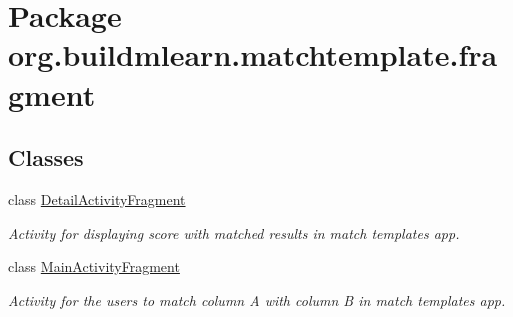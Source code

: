 \hypertarget{namespaceorg_1_1buildmlearn_1_1matchtemplate_1_1fragment}{}\section{Package org.\+buildmlearn.\+matchtemplate.\+fragment}
\label{namespaceorg_1_1buildmlearn_1_1matchtemplate_1_1fragment}
\subsection*{Classes}
\begin{DoxyCompactItemize}
\item 
class \hyperlink{classorg_1_1buildmlearn_1_1matchtemplate_1_1fragment_1_1DetailActivityFragment}{Detail\+Activity\+Fragment}
\begin{DoxyCompactList}\small\item\em Activity for displaying score with matched results in match template\textquotesingle{}s app. \end{DoxyCompactList}\item 
class \hyperlink{classorg_1_1buildmlearn_1_1matchtemplate_1_1fragment_1_1MainActivityFragment}{Main\+Activity\+Fragment}
\begin{DoxyCompactList}\small\item\em Activity for the users to match column A with column B in match template\textquotesingle{}s app. \end{DoxyCompactList}\end{DoxyCompactItemize}
